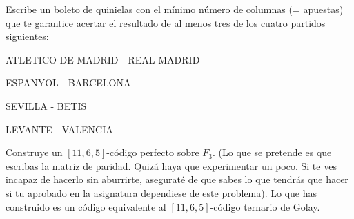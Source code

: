 \begin{problem}[14]
\ppart Escribe un boleto de quinielas con el mínimo número de columnas
(= apuestas) que te garantice acertar el resultado de al menos
tres de los cuatro partidos siguientes:

ATLETICO DE MADRID - REAL MADRID

ESPANYOL - BARCELONA

SEVILLA - BETIS

LEVANTE - VALENCIA


\solution
\end{problem}


\begin{problem}[15]
 Construye un $[11,6,5]$-código perfecto sobre $ F_3$. (Lo
que se pretende es que escribas la matriz de paridad. Quizá haya
que experimentar un poco. Si te ves incapaz de hacerlo sin
aburrirte, aseguraté de que sabes lo que tendrás que hacer si tu
aprobado en la asignatura dependiese de este problema). Lo que has
construido es un código equivalente al $[11,6,5]$-código ternario
de Golay.
\solution
\end{problem}

